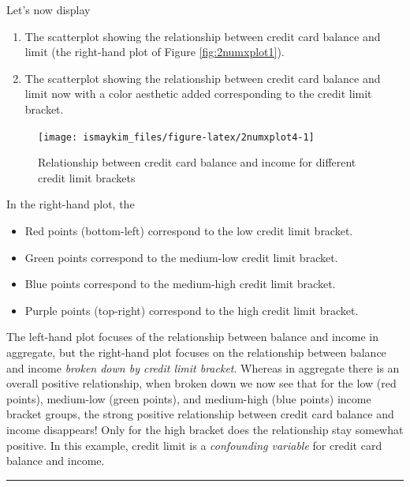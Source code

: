 \documentclass[12pt, krantz2,]{krantz}
\providecommand{\tightlist}{%
  \setlength{\itemsep}{0pt}\setlength{\parskip}{0pt}}
\begin{document}
Let's now display

\begin{enumerate}
\def\labelenumi{\arabic{enumi}.}
\tightlist
\item
  The scatterplot showing the relationship between credit card balance and limit (the right-hand plot of Figure \ref{fig:2numxplot1}).
\item
  The scatterplot showing the relationship between credit card balance and limit now with a color aesthetic added corresponding to the credit limit bracket.
\end{enumerate}

\begin{figure}

{\centering \texttt{[image: ismaykim\_files/figure-latex/2numxplot4-1]} 

}

\caption{Relationship between credit card balance and income for different credit limit brackets}\label{fig:2numxplot4}
\end{figure}

In the right-hand plot, the

\begin{itemize}
\tightlist
\item
  Red points (bottom-left) correspond to the low credit limit bracket.
\item
  Green points correspond to the medium-low credit limit bracket.
\item
  Blue points correspond to the medium-high credit limit bracket.
\item
  Purple points (top-right) correspond to the high credit limit bracket.
\end{itemize}

The left-hand plot focuses of the relationship between balance and income in aggregate, but the right-hand plot focuses on the relationship between balance and income \emph{broken down by credit limit bracket}. Whereas in aggregate there is an overall positive relationship, when broken down we now see that for the low (red points), medium-low (green points), and medium-high (blue points) income bracket groups, the strong positive relationship between credit card balance and income disappears! Only for the high bracket does the relationship stay somewhat positive. In this example, credit limit is a \emph{confounding variable} for credit card balance and income.

\begin{center}\rule{0.5\linewidth}{\linethickness}\end{center}
\end{document}

